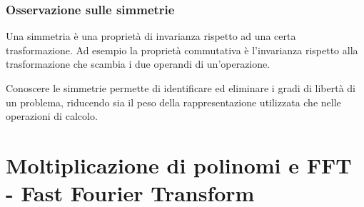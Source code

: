 \subsubsection*{Osservazione sulle simmetrie}
Una simmetria è una proprietà di invarianza rispetto ad una certa trasformazione. Ad esempio la proprietà commutativa è
l'invarianza rispetto alla trasformazione che scambia i due operandi di un'operazione. 

Conoscere le simmetrie permette di identificare ed eliminare i gradi di libertà di un problema, riducendo sia il peso della
rappresentazione utilizzata che nelle operazioni di calcolo.

\newpage

\section{Moltiplicazione di polinomi e FFT - Fast Fourier Transform}
